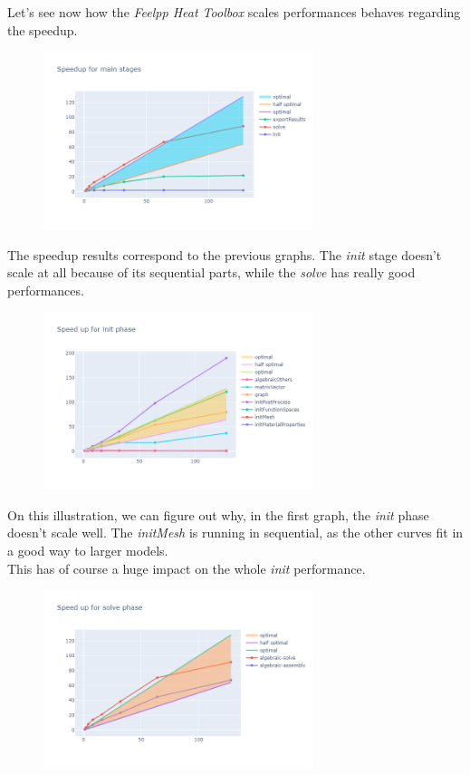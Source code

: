 \documentclass[12pt]{article}
\begin{document}
\newpage
Let's see now how the \textit{Feelpp Heat Toolbox} scales performances behaves regarding the speedup.
\begin{figure}[H]
    \centering
    \includegraphics[width=0.7\textwidth]{../illustrations/gaya-graphs/gayaSpeedup.png}

\end{figure}

The speedup results correspond to the previous graphs.
The \textit{init} stage doesn't scale at all because of its sequential parts, while the \textit{solve} has really good performances.


\begin{figure}[H]
    \centering
    \includegraphics[width=0.7\textwidth]{../illustrations/gaya-graphs/gayaInit.png}
\end{figure}

On this illustration, we can figure out why, in the first graph, the \textit{init} phase doesn't scale well. 
The \textit{initMesh} is running in sequential, as the other curves fit in a good way to larger models. \\
This has of course a huge impact on the whole \textit{init} performance.

\begin{figure}[H]
    \centering
    \includegraphics[width=0.7\textwidth]{../illustrations/gaya-graphs/gayaSolve.png}
\end{figure}
\end{document}
